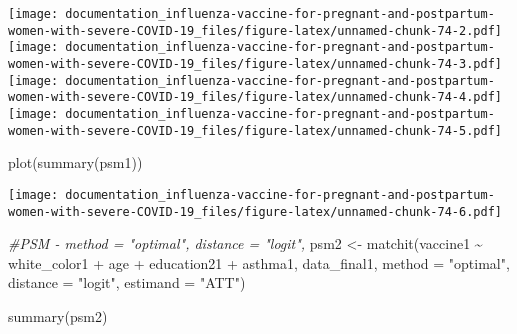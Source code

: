 \documentclass[
]{article}
\newenvironment{Shaded}{\begin{snugshade}}{\end{snugshade}}
\newcommand{\AttributeTok}[1]{\textcolor[rgb]{0.77,0.63,0.00}{#1}}
\newcommand{\CommentTok}[1]{\textcolor[rgb]{0.56,0.35,0.01}{\textit{#1}}}
\newcommand{\FunctionTok}[1]{\textcolor[rgb]{0.00,0.00,0.00}{#1}}
\newcommand{\NormalTok}[1]{#1}
\newcommand{\OtherTok}[1]{\textcolor[rgb]{0.56,0.35,0.01}{#1}}
\newcommand{\SpecialCharTok}[1]{\textcolor[rgb]{0.00,0.00,0.00}{#1}}
\newcommand{\StringTok}[1]{\textcolor[rgb]{0.31,0.60,0.02}{#1}}
\begin{document}
\texttt{[image: documentation\_influenza-vaccine-for-pregnant-and-postpartum-women-with-severe-COVID-19\_files/figure-latex/unnamed-chunk-74-2.pdf]}
\texttt{[image: documentation\_influenza-vaccine-for-pregnant-and-postpartum-women-with-severe-COVID-19\_files/figure-latex/unnamed-chunk-74-3.pdf]}
\texttt{[image: documentation\_influenza-vaccine-for-pregnant-and-postpartum-women-with-severe-COVID-19\_files/figure-latex/unnamed-chunk-74-4.pdf]}
\texttt{[image: documentation\_influenza-vaccine-for-pregnant-and-postpartum-women-with-severe-COVID-19\_files/figure-latex/unnamed-chunk-74-5.pdf]}

\begin{Shaded}
\begin{Highlighting}[]
\FunctionTok{plot}\NormalTok{(}\FunctionTok{summary}\NormalTok{(psm1))}
\end{Highlighting}
\end{Shaded}

\texttt{[image: documentation\_influenza-vaccine-for-pregnant-and-postpartum-women-with-severe-COVID-19\_files/figure-latex/unnamed-chunk-74-6.pdf]}

\begin{Shaded}
\begin{Highlighting}[]
\CommentTok{\#PSM {-}  method = "optimal", distance = "logit",}
\NormalTok{psm2 }\OtherTok{\textless{}{-}} \FunctionTok{matchit}\NormalTok{(vaccine1 }\SpecialCharTok{\textasciitilde{}}\NormalTok{ white\_color1 }\SpecialCharTok{+}\NormalTok{ age }\SpecialCharTok{+}\NormalTok{ education21 }\SpecialCharTok{+}\NormalTok{ asthma1, data\_final1, }\AttributeTok{method =} \StringTok{"optimal"}\NormalTok{, }\AttributeTok{distance =} \StringTok{"logit"}\NormalTok{, }\AttributeTok{estimand =}  \StringTok{"ATT"}\NormalTok{)}

\FunctionTok{summary}\NormalTok{(psm2)}
\end{Highlighting}
\end{Shaded}
\end{document}
